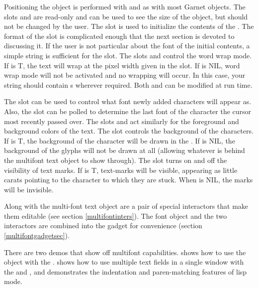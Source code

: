 Positioning the object is
performed with  and  as with most Garnet objects.  The slots
 and  are read-only and can be used to
see the size of the object,
but should not be changed by the user.  The  slot is used to
initialize the contents of the .  The format of the
 slot is complicated enough that the next section is devoted
to discussing it.  If the user is not particular about the font of the initial
contents, a simple string is sufficient for the
 slot.  The slots
 and  control the word wrap mode.
If  is T, the text will wrap at the pixel width given in the
 slot.  If  is {\sc NIL}, word wrap mode will
not be activated and no wrapping will occur.  In this case, your
string should contain s wherever required.
Both  and  can be modified at run time.

The  slot can
be used to control what font newly added characters will appear as.  Also, the
 slot can be polled to determine the last font of the
character the cursor most recently passed over.  The slots 
and  act similarly for the foreground and background colors
of the text.  The slot
 controls the background of the characters.  If
 is T, the background of the character will be drawn in
the .  If  is {\sc NIL},
the background of the glyphs will not be drawn at all (allowing
whatever is behind the multifont text object to show through).  The slot
 turns on and off the visibility of text marks.  If
 is T, text-marks will be visible, appearing as little carats
pointing to the character to which they are stuck.  When  is
NIL, the marks will be invisible.

Along with the multi-font text object are a pair of special
interactors that make them editable (see section
\ref{multifontinters}).  The font
object and the two interactors are combined into the
 gadget for convenience (section
\ref{multifontgadgetsec}).

There are two demos that show off multifont capabilities.  
shows how to use the  object with the
.   shows how to use
multiple text fields in a single window with the
 and , and
demonstrates the indentation and paren-matching features of lisp mode.

